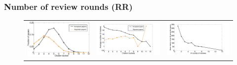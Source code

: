 \subsubsection*{Number of review rounds (RR)}

 \begin{figure}[htpb]
 \centering
 \begin{tabular}{ccc}
 \includegraphics[scale=0.12]{./texfiles/Chapter_4/jcdl/figures/citation_bucket_frac_paper} & \includegraphics[scale=0.12]{./texfiles/Chapter_4/jcdl/figures/citation_bucket_reviews_all-eps-converted-to.pdf} & \includegraphics[scale=0.12]{./texfiles/Chapter_4/jcdl/figures/cit_rnd_rev-eps-converted-to.pdf}

\end{tabular}
\end{figure}
